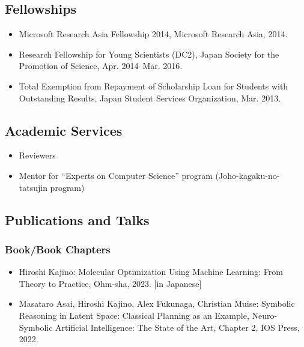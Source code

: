 \documentclass[a4paper,9pt]{article}
\begin{document}
\subsection*{Fellowships}
\begin{itemize}
 \item Microsoft Research Asia Fellowship 2014, Microsoft Research Asia, 2014.
 \item Research Fellowship for Young Scientists (DC2), Japan Society for the Promotion of Science, Apr. 2014--Mar. 2016.
 \item Total Exemption from Repayment of Scholarship Loan for Students with Outstanding Results, Japan Student Services Organization, Mar. 2013.
\end{itemize}

\subsection*{Academic Services}
\begin{itemize}
 \item Reviewers
 \item Mentor for ``Experts on Computer Science'' program (Joho-kagaku-no-tatsujin program)
\end{itemize}


\subsection*{Publications and Talks}

\subsubsection*{Book/Book Chapters}
\begin{itemize}
 \item Hiroshi Kajino: Molecular Optimization Using Machine Learning: From Theory to Practice, Ohm-sha, 2023. [in Japanese]
 \item Masataro Asai, Hiroshi Kajino, Alex Fukunaga, Christian Muise: Symbolic Reasoning in Latent Space: Classical Planning as an Example, Neuro-Symbolic Artificial Intelligence: The State of the Art, Chapter 2, IOS Press, 2022.
\end{itemize}
\end{document}
